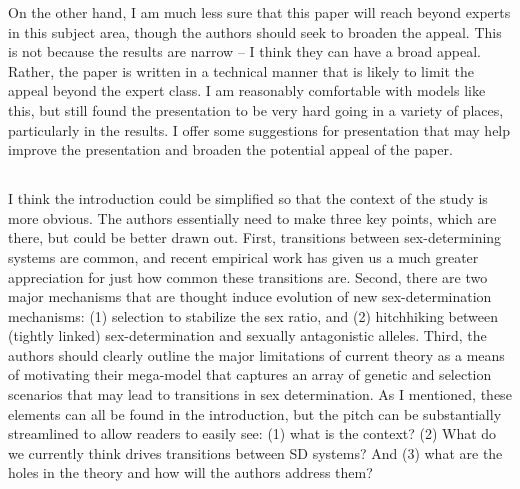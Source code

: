 \documentclass[10pt,letterpaper]{article}
\begin{document}
On the other hand, I am much less sure that this paper will reach beyond experts in this subject area, though the authors should seek to broaden the appeal. This is not because the results are narrow -- I think they can have a broad appeal. Rather, the paper is written in a technical manner that is likely to limit the appeal beyond the expert class. I am reasonably comfortable with models like this, but still found the presentation to be very hard going in a variety of places, particularly in the results. I offer some suggestions for presentation that may help improve the presentation and broaden the potential appeal of the paper.

\noindent\subsection{}
I think the introduction could be simplified so that the context of the study is more obvious. The authors essentially need to make three key points, which are there, but could be better drawn out. First, transitions between sex-determining systems are common, and recent empirical work has given us a much greater appreciation for just how common these transitions are. Second, there are two major mechanisms that are thought induce evolution of new sex-determination mechanisms: (1) selection to stabilize the sex ratio, and (2) hitchhiking between (tightly linked) sex-determination and sexually antagonistic alleles. Third, the authors should clearly outline the major limitations of current theory as a means of motivating their mega-model that captures an array of genetic and selection scenarios that may lead to transitions in sex determination. As I mentioned, these elements can all be found in the introduction, but the pitch can be substantially streamlined to allow readers to easily see: (1) what is the context? (2) What do we currently think drives transitions between SD systems? And (3) what are the holes in the theory and how will the authors address them?
\end{document}
